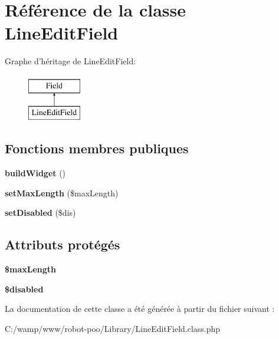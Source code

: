 \hypertarget{class_library_1_1_line_edit_field}{\section{Référence de la classe Line\+Edit\+Field}
\label{class_library_1_1_line_edit_field}
}
Graphe d'héritage de Line\+Edit\+Field\+:\begin{figure}[H]
\begin{center}
\leavevmode
\includegraphics[height=2.000000cm]{class_library_1_1_line_edit_field}
\end{center}
\end{figure}
\subsection*{Fonctions membres publiques}
\begin{DoxyCompactItemize}
\item 
\hypertarget{class_library_1_1_line_edit_field_a3724547eb0ec2b00884571328d7e2d5d}{{\bfseries build\+Widget} ()}\label{class_library_1_1_line_edit_field_a3724547eb0ec2b00884571328d7e2d5d}

\item 
\hypertarget{class_library_1_1_line_edit_field_a0cabf6bc3fd7c058ee339c28af5e91b0}{{\bfseries set\+Max\+Length} (\$max\+Length)}\label{class_library_1_1_line_edit_field_a0cabf6bc3fd7c058ee339c28af5e91b0}

\item 
\hypertarget{class_library_1_1_line_edit_field_acc543f21e935631a0caa5fe20ac5d7d9}{{\bfseries set\+Disabled} (\$dis)}\label{class_library_1_1_line_edit_field_acc543f21e935631a0caa5fe20ac5d7d9}

\end{DoxyCompactItemize}
\subsection*{Attributs protégés}
\begin{DoxyCompactItemize}
\item 
\hypertarget{class_library_1_1_line_edit_field_aab871c2907a2cc6907062e8665fdb1f1}{{\bfseries \$max\+Length}}\label{class_library_1_1_line_edit_field_aab871c2907a2cc6907062e8665fdb1f1}

\item 
\hypertarget{class_library_1_1_line_edit_field_a6c108f5b26242d862f6e51869fbfd271}{{\bfseries \$disabled}}\label{class_library_1_1_line_edit_field_a6c108f5b26242d862f6e51869fbfd271}

\end{DoxyCompactItemize}


La documentation de cette classe a été générée à partir du fichier suivant \+:\begin{DoxyCompactItemize}
\item 
C\+:/wamp/www/robot-\/poo/\+Library/Line\+Edit\+Field.\+class.\+php\end{DoxyCompactItemize}
